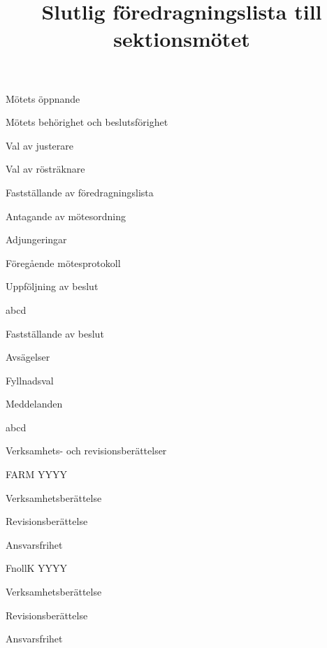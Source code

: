 \documentclass{sektionsmote}
\title{Slutlig föredragningslista till sektionsmötet}
\begin{document}
\maketitle

\begin{ootd}

\item{Mötets öppnande}

\item{Mötets behörighet och beslutsförighet}

\item{Val av justerare}

\item{Val av rösträknare}

\item{Fastställande av föredragningslista}

\item{Antagande av mötesordning}

\item{Adjungeringar}

\item{Föregående mötesprotokoll}

\item{Uppföljning av beslut}
\begin{ootd}
    \item abcd
\end{ootd}

\item{Fastställande av beslut}
\begin{ootd}
    \item Avsägelser
    \item Fyllnadsval
\end{ootd}

\item{Meddelanden}
\begin{ootd}
    \item abcd
\end{ootd}

\item{Verksamhets- och revisionsberättelser}
\begin{ootd}
    \item FARM YYYY
    \begin{ootd}
        \item Verksamhetsberättelse
        \item Revisionsberättelse
        \item Ansvarsfrihet
    \end{ootd}
    \item FnollK YYYY
    \begin{ootd}
        \item Verksamhetsberättelse
        \item Revisionsberättelse
        \item Ansvarsfrihet
    \end{ootd}
\end{ootd}


\end{ootd}
\end{document}
